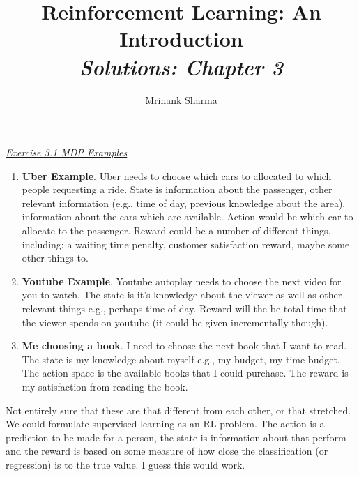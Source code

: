 \documentclass{article}
\title{\textbf{Reinforcement Learning: An Introduction}\\
\textit{Solutions: Chapter 3}
}
\author{Mrinank Sharma}
\newcommand{\myq}[1]{%
	\vspace{1em}
	\noindent\underline{\emph{Exercise #1}}\vspace{0.25em}\linebreak
}
\begin{document}
\maketitle

\myq{3.1 MDP Examples}
\begin{enumerate}
	\item \textbf{Uber Example}. Uber needs to choose which cars to allocated to which people requesting a ride. State is information about the passenger, other relevant information (e.g., time of day, previous knowledge about the area), information about the cars which are available. Action would be which car to allocate to the passenger. Reward could be a number of different things, including: a waiting time penalty, customer satisfaction reward, maybe some other things to. 
	
	\item \textbf{Youtube Example}. Youtube autoplay needs to choose the next video for you to watch. The state is it's knowledge about the viewer as well as other relevant things e.g., perhaps time of day. Reward will the be total time that the viewer spends on youtube (it could be given incrementally though).
	
	\item \textbf{Me choosing a book}. I need to choose the next book that I want to read. The state is my knowledge about myself e.g., my budget, my time budget. The action space is the available books that I could purchase. The reward is my satisfaction from reading the book.
\end{enumerate}
Not entirely sure that these are that different from each other, or that stretched. We could formulate supervised learning as an RL problem. The action is a prediction to be made for a person, the state is information about that perform and the reward is based on some measure of how close the classification (or regression) is to the true value. I guess this would work. 
\end{document}
